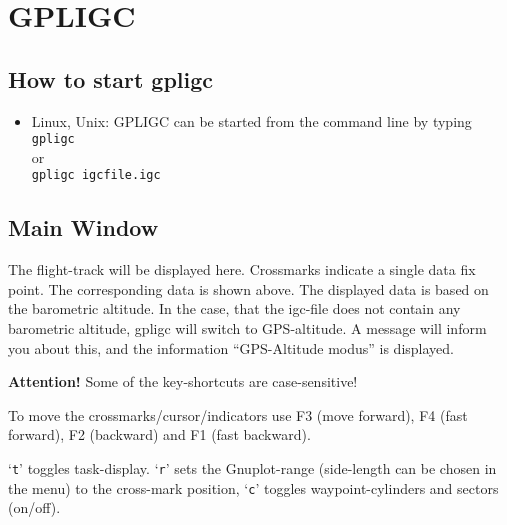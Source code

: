 

\section{GPLIGC}

\subsection{How to start gpligc}

\begin{itemize}
\item{Linux, Unix:}
GPLIGC can be started from the command line by typing \\
\texttt{gpligc}\\
or\\
\texttt{gpligc  igcfile.igc}


\end{itemize}

\subsection{Main Window}
The flight-track will be displayed here.
Crossmarks indicate a single data fix point.
The corresponding data is shown above.
The displayed data is based on the barometric altitude.
In the case, that the igc-file does not contain any barometric altitude,
gpligc will switch to GPS-altitude.
A message will inform you about this, and
the information ``GPS-Altitude modus'' is displayed.

\textbf{Attention!} Some of the key-shortcuts are case-sensitive!

To move the crossmarks/cursor/indicators use F3 (move forward), F4 (fast forward), F2 (backward)  and F1 (fast backward).

`\texttt{t}' toggles task-display.
`\texttt{r}' sets the Gnuplot-range (side-length can be chosen in the menu) to the cross-mark position,
`\texttt{c}' toggles waypoint-cylinders and sectors (on/off).

